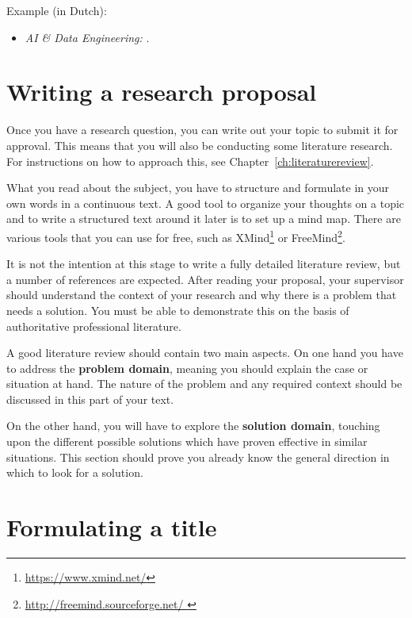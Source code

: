 Example (in Dutch):

\begin{itemize}
	\item \emph{AI \& Data Engineering:}  \autocite{Cluyse2023}.
\end{itemize}

\section{Writing a research proposal}
\label{sec:researchproposal}

Once you have a research question, you can write out your topic to submit it for approval. This means that you will also be conducting some literature research. For instructions on how to approach this, see Chapter~\ref{ch:literaturereview}.

What you read about the subject, you have to structure and formulate in your own words in a continuous text. A good tool to organize your thoughts on a topic and to write a structured text around it later is to set up a mind map. There are various tools that you can use for free, such as XMind\footnote{\url{https://www.xmind.net/}} or FreeMind\footnote{\url{http://freemind.sourceforge.net/ }}.


It is not the intention at this stage to write a fully detailed literature review, but a number of references are expected. After reading your proposal, your supervisor should understand the context of your research and why there is a problem that needs a solution. You must be able to demonstrate this on the basis of authoritative professional literature.

A good literature review should contain two main aspects. On one hand you have to address the \textbf{problem domain}, meaning you should explain the case or situation at hand. The nature of the problem and any required context should be discussed in this part of your text.

On the other hand, you will have to explore the \textbf{solution domain}, touching upon the different possible solutions which have proven effective in similar situations.  This section should prove you already know the general direction in which to look for a solution.

\section{Formulating a title}
\label{sec:formulating_a_title}

